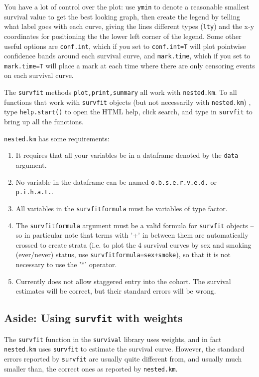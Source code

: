 \documentclass[10pt]{article}
\begin{document}
You have a lot of control over the plot: use \texttt{ymin} to denote a reasonable smallest
survival value to get the best looking graph, then create the legend by telling what label
goes with each curve, giving the lines different types (\texttt{lty}) and the x-y
coordinates for positioning the the lower left corner of the legend.  Some other useful
options are \texttt{conf.int}, which if you set to \texttt{conf.int=T} will plot pointwise
confidence bands around each survival curve, and \texttt{mark.time}, which if you set to
\texttt{mark.time=T} will place a mark at each time where there are only censoring events
on each survival curve.

The \texttt{survfit} methods \texttt{plot,print,summary} all work with \texttt{nested.km}.
To all functions that work with \texttt{survfit} objects (but not necessarily with
\texttt{nested.km}) , type \texttt{help.start()} to open the HTML help, click search, and
type in \texttt{survfit} to bring up all the functions.

\texttt{nested.km} has some requirements:
\begin{enumerate}
\item It requires that all your variables be in a dataframe denoted by the \texttt{data}
  argument.
\item No variable in the dataframe can be named \texttt{o.b.s.e.r.v.e.d.} or
\texttt{p.i.h.a.t.}.
\item All variables in the \texttt{survfitformula} must be variables of type factor.
\item The \texttt{survfitformula} argument must be a valid formula for \texttt{survfit}
  objects -- so in particular note that terms with '+' in between them are automatically
  crossed to create strata (i.e. to plot the 4 survival curves by sex and smoking
  (ever/never) status, use \texttt{survfitformula=sex+smoke}), so that it is not necessary
  to use the '*' operator.
\item Currently does not allow staggered entry into the cohort.  The
  survival estimates will be correct, but their standard errors will be wrong.
\end{enumerate}


\subsection{Aside: Using \texttt{survfit} with weights}
\label{sec:texttts-with-weights}

The \texttt{survfit} function in the \texttt{survival} library uses weights, and in fact
\texttt{nested.km} uses \texttt{survfit} to estimate the survival curve.  However, the
standard errors reported by \texttt{survfit} are usually quite different from, and usually
much smaller than, the correct ones as reported by \texttt{nested.km}.
\end{document}
